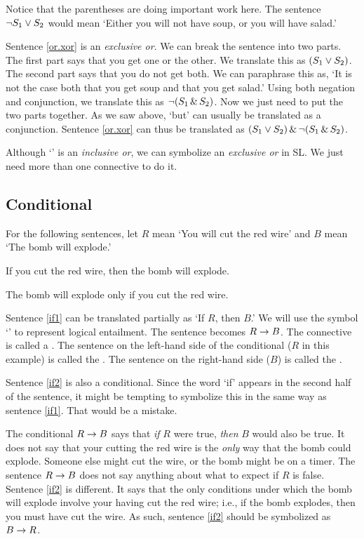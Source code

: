 Notice that the parentheses are doing important work here. The sentence $\neg S_1 \vee S_2$ would mean `Either you will not have soup, or you will have salad.'

Sentence \ref{or.xor} is an \emph{exclusive or}. We can break the sentence into two parts. The first part says that you get one or the other. We translate this as $(S_1 \vee S_2)$. The second part says that you do not get both. We can paraphrase this as, `It is not the case both that you get soup and that you get salad.' Using both negation and conjunction, we translate this as $\neg(S_1 \,\&\, S_2)$. Now we just need to put the two parts together. As we saw above, `but' can usually be translated as a conjunction. Sentence \ref{or.xor} can thus be translated as $(S_1 \vee S_2) \,\&\, \neg(S_1 \,\&\, S_2)$.

Although `\eor' is an \emph{inclusive or}, we can symbolize an \emph{exclusive or} in {SL}. We just need more than one connective to do it.


\subsection{Conditional}
For the following sentences, let $R$ mean `You will cut the red wire' and $B$ mean `The bomb will explode.'

\begin{earg}
\item[\ex{if1}] If you cut the red wire, then the bomb will explode.
\item[\ex{if2}] The bomb will explode only if you cut the red wire.
\end{earg}

Sentence \ref{if1} can be translated partially as `If $R$, then $B$.' We will use the symbol `\eif' to represent logical {entailment}. The sentence becomes $R\rightarrow B$. The connective is called a . The sentence on the left-hand side of the conditional ($R$ in this example) is called the . The sentence on the right-hand side ($B$) is called the .

Sentence \ref{if2} is also a conditional. Since the word `if' appears in the second half of the sentence, it might be tempting to symbolize this in the same way as sentence \ref{if1}. That would be a mistake.

The conditional $R\rightarrow B$ says that \emph{if} $R$ were true, \emph{then} $B$ would also be true. It does not say that your cutting the red wire is the \emph{only} way that the bomb could explode. Someone else might cut the wire, or the bomb might be on a timer. The sentence $R\rightarrow B$ does not say anything about 
what to expect if $R$ is false. Sentence \ref{if2} is different. It says that the only conditions under which the bomb will explode involve your having cut the red wire; i.e., if the bomb explodes, then you must have cut the wire. As such, sentence \ref{if2} should be symbolized as $B \rightarrow R$.

